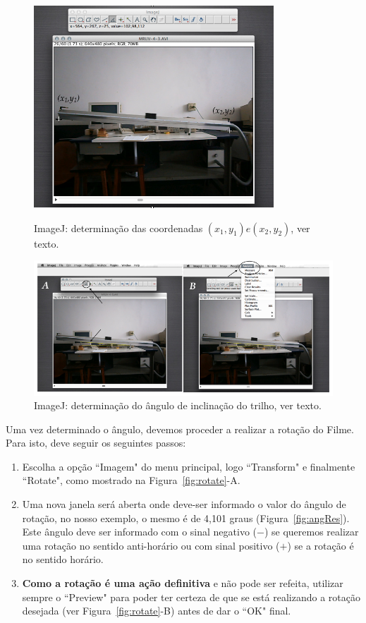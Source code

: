 \begin{enumerate}
\begin{figure}[t!]
\begin{center}
\includegraphics[width=9cm]{fig/coordman}
\caption{\label{fig:coord} ImageJ: determinação das coordenadas $(x_1,y_1) e (x_2, y_2)$, ver texto.}
\vspace{0.5cm}
\includegraphics[width=16cm]{fig/AnguloAuto}
\caption{\label{fig:angulo} ImageJ: determinação do ângulo de inclinação do trilho, ver texto.}
\vspace{-0.5cm}
\end{center}
\end{figure}

Uma vez determinado o ângulo, devemos proceder a realizar a rotação do Filme. Para isto, deve seguir os seguintes passos: 
\begin{enumerate}
\item Escolha a opção ``Imagem" do menu principal, logo ``Transform" e finalmente ``Rotate", como mostrado na Figura~\ref{fig:rotate}-A.
\item Uma nova janela será aberta onde deve-ser informado o valor do ângulo de rotação, no nosso exemplo, o mesmo é de 4,101 graus (Figura~\ref{fig:angRes}). Este ângulo deve ser informado com o sinal negativo ($-$) se queremos realizar uma rotação no sentido anti-horário ou com sinal positivo ($+$) se a rotação é no sentido horário.
\item {\bf Como a rotação é uma ação definitiva} e não pode ser refeita, utilizar sempre o ``Preview" para poder ter certeza de que se está realizando a rotação desejada (ver Figura~\ref{fig:rotate}-B) antes de dar o ``OK" final.
\end{enumerate}


\end{enumerate}

